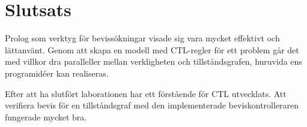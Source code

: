 \section{Slutsats}

Prolog som verktyg för bevissökningar visade sig vara mycket effektivt och lättanvänt. Genom att skapa en modell med CTL-regler för ett problem går det med villkor dra paralleller mellan verkligheten och tillståndsgrafen, huruvida ens programidéer kan realiseras.

Efter att ha slutfört laborationen har ett förstående för CTL utvecklats. Att verifiera bevis för en tillståndsgraf med den implementerade beviskontrolleraren fungerade mycket bra.